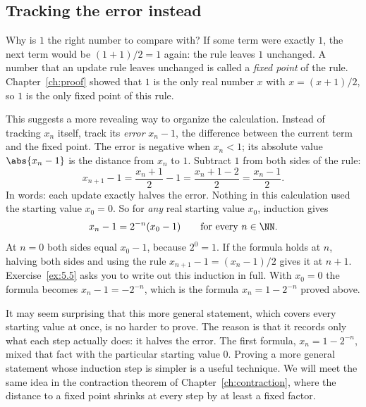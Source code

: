 \subsection*{Tracking the error instead}
Why is $1$ the right number to compare with? If some term were exactly $1$, the next term would be $(1+1)/2=1$ again: the rule leaves $1$ unchanged. A number that an update rule leaves unchanged is called a \emph{fixed point} of the rule. Chapter~\ref{ch:proof} showed that $1$ is the only real number $x$ with $x=(x+1)/2$, so $1$ is the only fixed point of this rule.

This suggests a more revealing way to organize the calculation. Instead of tracking $x_n$ itself, track its \emph{error} $x_n-1$, the difference between the current term and the fixed point. The error is negative when $x_n<1$; its absolute value $\abs{x_n-1}$ is the distance from $x_n$ to $1$. Subtract $1$ from both sides of the rule:
\[
x_{n+1}-1=\frac{x_n+1}{2}-1=\frac{x_n+1-2}{2}=\frac{x_n-1}{2}.
\]
In words: each update exactly halves the error. Nothing in this calculation used the starting value $x_0=0$. So for \emph{any} real starting value $x_0$, induction gives
\[
x_n-1=2^{-n}(x_0-1)\qquad\text{for every } n\in\NN.
\]
At $n=0$ both sides equal $x_0-1$, because $2^0=1$. If the formula holds at $n$, halving both sides and using the rule $x_{n+1}-1=(x_n-1)/2$ gives it at $n+1$. Exercise~\ref{ex:5.5} asks you to write out this induction in full. With $x_0=0$ the formula becomes $x_n-1=-2^{-n}$, which is the formula $x_n=1-2^{-n}$ proved above.

It may seem surprising that this more general statement, which covers every starting value at once, is no harder to prove. The reason is that it records only what each step actually does: it halves the error. The first formula, $x_n=1-2^{-n}$, mixed that fact with the particular starting value $0$. Proving a more general statement whose induction step is simpler is a useful technique. We will meet the same idea in the contraction theorem of Chapter~\ref{ch:contraction}, where the distance to a fixed point shrinks at every step by at least a fixed factor.
